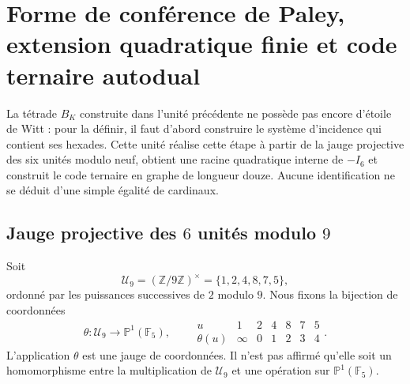 \label{chap:83-20}




\section{Forme de conférence de Paley, extension quadratique finie et code ternaire autodual}
\label{p12-83-c20-s1:chap:paley-extension-cuadratica-codigo-ternario}

La tétrade \(B_K\) construite dans l'unité précédente ne possède pas encore
d'étoile de Witt : pour la définir, il faut d'abord construire le système
d'incidence qui contient ses hexades. Cette unité réalise cette étape à partir de la
jauge projective des six unités modulo neuf, obtient une racine
quadratique interne de \(-I_6\) et construit le code ternaire en graphe de
longueur douze. Aucune identification ne se déduit d'une simple égalité de
cardinaux.

\subsection{Jauge projective des \(6\) unités modulo \(9\)}

Soit
\[
 \mathcal U_9=(\mathbb Z/9\mathbb Z)^\times
 =\{1,2,4,8,7,5\},
\]
ordonné par les puissances successives de \(2\) modulo \(9\). Nous fixons la
bijection de coordonnées
\begin{equation}
 \theta:\mathcal U_9\longrightarrow\mathbb P^1(\mathbb F_5),
 \qquad
 \begin{array}{c|cccccc}
 u&1&2&4&8&7&5\\ \hline
 \theta(u)&\infty&0&1&2&3&4
 \end{array}.
 \label{p12-83-c20-s1:eq:calibre-unidades-paley}
\end{equation}
L'application \(\theta\) est une jauge de coordonnées. Il n'est pas affirmé
qu'elle soit un homomorphisme entre la multiplication de \(\mathcal U_9\) et une
opération sur \(\mathbb P^1(\mathbb F_5)\).

